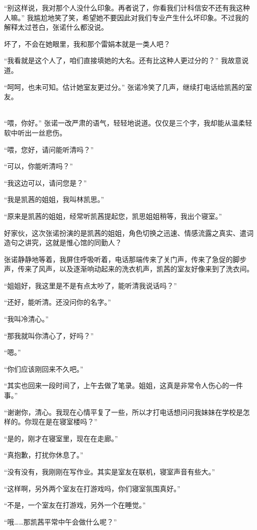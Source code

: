 \documentclass[UTF8]{ctexart}
\begin{document}
“别这样说，我对那个人没什么印象。再者说了，你看我们计科信安不还有我这种人嘛。” 我尴尬地笑了笑，希望她不要因此对我们专业产生什么坏印象。不过我的解释太过苍白，张诺什么都没说。

坏了，不会在她眼里，我和那个雷娟本就是一类人吧？

“我看就是这个人了，咱们直接填她的大名。还有比这种人更过分的？” 我故意说道。

“呵呵，也未可知。估计她室友更过分。” 张诺冷笑了几声，继续打电话给凯茜的室友。

~\\

“喂，你好。” 张诺一改严肃的语气，轻轻地说道。仅仅是三个字，我却能从温柔轻软中听出一丝悲伤。

“喂，您好，请问能听清吗？”

“可以，你能听清吗？”

“我这边可以，请问您是？”

“我是凯茜的姐姐，我叫林凯思。”

“原来是凯茜的姐姐，经常听凯茜提起您，凯思姐姐稍等，我出个寝室。”

好家伙，这次张诺扮演的是凯茜的姐姐，角色切换之迅速、情感流露之真实、遣词造句之讲究，这就是惟心馆的同勤人？

张诺静静地等着，我屏住呼吸听着，电话那端传来了关门声，传来了急促的脚步声，传来了风声，以及逐渐响动起来的洗衣机声，凯茜的室友好像来到了洗衣间。

“姐姐好，我这里是不是有点太吵了，能听清我说话吗？”

“还好，能听清。还没问你的名字。”

“我叫冷清心。”

“那我就叫你清心了，好吗？”

“嗯。”

“你们应该刚回来不久吧。”

“其实也回来一段时间了，上午去做了笔录。姐姐，这真是非常令人伤心的一件事。”

“谢谢你，清心。我现在心情平复了一些，所以才打电话想问问我妹妹在学校是怎样的。你现在是在寝室楼吗？”

“是的，刚才在寝室里，现在在走廊。”

“真抱歉，打扰你休息了。”

“没有没有，我刚刚在写作业。其实是室友在联机，寝室声音有些大。”

“这样啊，另外两个室友在打游戏吗，你们寝室氛围真好。”

“不是，一个室友在打游戏，另外一个在睡觉。”

“哦……那凯茜平常中午会做什么呢？”
\end{document}
